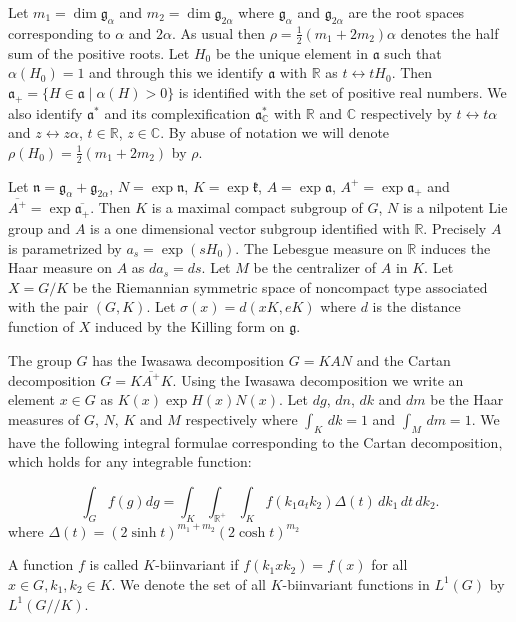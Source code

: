 \documentclass[11pt,reqno]{amsart}
\newcommand{\R}{\mathbb R}%
\newcommand{\C}{\mathbb C}%
\theoremstyle{definition}
\theoremstyle{definition}
\numberwithin{equation}{section}
\begin{document}
 
 Let $m_1=\dim \mathfrak g_\alpha$ and $m_2=\dim \mathfrak g_{2\alpha}$ where $\mathfrak g_\alpha$ and
 $\mathfrak g_{2\alpha}$ are the root spaces corresponding to $\alpha$ and $2\alpha$. As usual then $\rho=\frac 12(m_1+2m_2)\alpha$ denotes the half sum of the positive roots. Let  $H_0$ be the unique element in $\mathfrak a$ such that $\alpha(H_0)=1$ and through this we identify $\mathfrak a$ with $\R$ as $t\leftrightarrow tH_0$. Then $\mathfrak a_+= \{H\in \mathfrak a\mid \alpha(H)>0\}$ is identified with the set of positive real numbers. We also identify $\mathfrak a^*$ and its complexification $\mathfrak a^*_\C$ with $\R$  and $\C$ respectively by $t\leftrightarrow t\alpha$ and  $z\leftrightarrow z\alpha$, $t\in \R$, $z\in \C$. By abuse of notation we will denote $\rho(H_0)=\frac 12(m_1+2m_2)$ by $\rho$.
 
  
 Let $\mathfrak n= \mathfrak g_\alpha+\mathfrak g_{2\alpha}$, $N=\exp \mathfrak n$,
 $K=\exp \mathfrak k$, $A=\exp \mathfrak a$, $A^+=\exp \mathfrak  a_+$ and $\overline{A^+}=\exp \overline{\mathfrak  a_+}$. Then $K$ is a maximal compact subgroup of $G$, $N$ is a nilpotent Lie group and $A$ is a one dimensional vector subgroup identified
  with $\R$.
 Precisely $A$ is parametrized by $a_s=\exp(sH_0)$.  The Lebesgue measure on $\R$ induces the Haar measure on $A$ as $da_s=ds$. Let $M$ be the centralizer of $A$ in $K$. Let  $X=G/K$ be the Riemannian symmetric space of noncompact type associated with the pair $(G, K)$.
Let $\sigma(x)=d(xK, eK)$ where $d$ is the distance function of $X$ induced by the Killing form on $\mathfrak g$. 


The group $G$ has  the Iwasawa decomposition
$G=KAN$ and the Cartan decomposition $G=K\overline{A^+}K$.
Using the Iwasawa decomposition  we write an element $x\in G$ as $K(x)\exp H(x)N(x)$.
Let $dg$, $dn$, $dk$ and $dm$ be the Haar measures of $G$, $N$,
$K$ and $M$ respectively where $\int_K\,dk=1$ and $\int_M\,dm=1$.
We have the following integral formulae corresponding to the Cartan
decomposition, which holds for any integrable function:

\begin{equation}
\int_Gf(g)dg=\int_K\int_{\R^+}\int_K f(k_1a_tk_2) \Delta(t)\,dk_1\,dt\,dk_2. \label{polar}
\end{equation} 
where $\Delta(t)=(2\sinh t)^{m_1 + m_2}(2\cosh t)^{m_2}$


A function $f$ is called $K$-biinvariant if $f(k_1xk_2)=f(x)$ for all $x\in G, k_1, k_2\in K$.  We denote the set of all $K$-biinvariant functions in $L^1(G)$ by $L^1(G//K)$.
\end{document}
